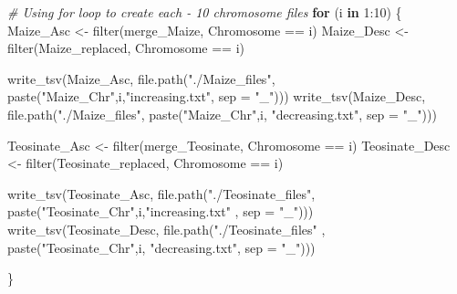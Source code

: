 \documentclass[
]{article}
\newenvironment{Shaded}{\begin{snugshade}}{\end{snugshade}}
\newcommand{\AttributeTok}[1]{\textcolor[rgb]{0.77,0.63,0.00}{#1}}
\newcommand{\CommentTok}[1]{\textcolor[rgb]{0.56,0.35,0.01}{\textit{#1}}}
\newcommand{\ControlFlowTok}[1]{\textcolor[rgb]{0.13,0.29,0.53}{\textbf{#1}}}
\newcommand{\DecValTok}[1]{\textcolor[rgb]{0.00,0.00,0.81}{#1}}
\newcommand{\FunctionTok}[1]{\textcolor[rgb]{0.00,0.00,0.00}{#1}}
\newcommand{\NormalTok}[1]{#1}
\newcommand{\OtherTok}[1]{\textcolor[rgb]{0.56,0.35,0.01}{#1}}
\newcommand{\SpecialCharTok}[1]{\textcolor[rgb]{0.00,0.00,0.00}{#1}}
\newcommand{\StringTok}[1]{\textcolor[rgb]{0.31,0.60,0.02}{#1}}
\begin{document}
\begin{Shaded}
\begin{Highlighting}[]
\CommentTok{\# Using for loop to create each {-} 10 chromosome files}
\ControlFlowTok{for}\NormalTok{ (i }\ControlFlowTok{in} \DecValTok{1}\SpecialCharTok{:}\DecValTok{10}\NormalTok{) \{}
\NormalTok{  Maize\_Asc }\OtherTok{\textless{}{-}} \FunctionTok{filter}\NormalTok{(merge\_Maize, Chromosome }\SpecialCharTok{==}\NormalTok{ i)}
\NormalTok{  Maize\_Desc }\OtherTok{\textless{}{-}} \FunctionTok{filter}\NormalTok{(Maize\_replaced, Chromosome }\SpecialCharTok{==}\NormalTok{ i)}
  
  \FunctionTok{write\_tsv}\NormalTok{(Maize\_Asc, }\FunctionTok{file.path}\NormalTok{(}\StringTok{"./Maize\_files"}\NormalTok{, }\FunctionTok{paste}\NormalTok{(}\StringTok{"Maize\_Chr"}\NormalTok{,i,}\StringTok{"increasing.txt"}\NormalTok{, }\AttributeTok{sep =} \StringTok{"\_"}\NormalTok{)))}
  \FunctionTok{write\_tsv}\NormalTok{(Maize\_Desc, }\FunctionTok{file.path}\NormalTok{(}\StringTok{"./Maize\_files"}\NormalTok{, }\FunctionTok{paste}\NormalTok{(}\StringTok{"Maize\_Chr"}\NormalTok{,i, }\StringTok{"decreasing.txt"}\NormalTok{, }\AttributeTok{sep =} \StringTok{"\_"}\NormalTok{)))}
  
\NormalTok{  Teosinate\_Asc }\OtherTok{\textless{}{-}} \FunctionTok{filter}\NormalTok{(merge\_Teosinate, Chromosome }\SpecialCharTok{==}\NormalTok{ i)}
\NormalTok{  Teosinate\_Desc }\OtherTok{\textless{}{-}} \FunctionTok{filter}\NormalTok{(Teosinate\_replaced, Chromosome }\SpecialCharTok{==}\NormalTok{ i)}
  
  \FunctionTok{write\_tsv}\NormalTok{(Teosinate\_Asc, }\FunctionTok{file.path}\NormalTok{(}\StringTok{"./Teosinate\_files"}\NormalTok{, }\FunctionTok{paste}\NormalTok{(}\StringTok{"Teosinate\_Chr"}\NormalTok{,i,}\StringTok{"increasing.txt"}\NormalTok{ , }\AttributeTok{sep =} \StringTok{"\_"}\NormalTok{)))}
  \FunctionTok{write\_tsv}\NormalTok{(Teosinate\_Desc, }\FunctionTok{file.path}\NormalTok{(}\StringTok{"./Teosinate\_files"}\NormalTok{ , }\FunctionTok{paste}\NormalTok{(}\StringTok{"Teosinate\_Chr"}\NormalTok{,i, }\StringTok{"decreasing.txt"}\NormalTok{, }\AttributeTok{sep =} \StringTok{"\_"}\NormalTok{)))}
  
\NormalTok{\}}
\end{Highlighting}
\end{Shaded}
\end{document}

